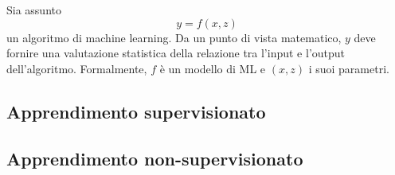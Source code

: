 \documentclass{subfiles}
\begin{document}
\label{sec:3}
Sia assunto
$$
    y = f(x, z)
$$
un algoritmo di machine learning.
Da un punto di vista matematico, $y$ deve fornire una valutazione statistica della relazione tra l'input e l'output dell'algoritmo.
Formalmente, $f$ è un modello di ML e $(x, z)$ i suoi parametri.

\subsection{Apprendimento supervisionato}


\subsection{Apprendimento non-supervisionato}

\clearpage
\end{document}
